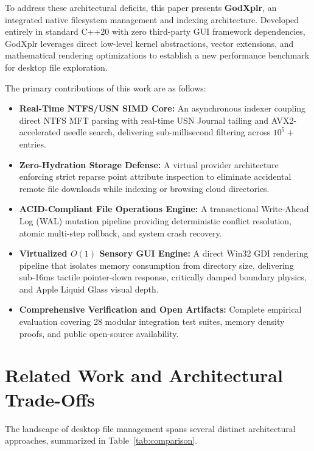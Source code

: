 \documentclass[conference]{IEEEtran}
\begin{document}
To address these architectural deficits, this paper presents \textbf{GodXplr}, an integrated native filesystem management and indexing architecture. Developed entirely in standard C++20 with zero third-party GUI framework dependencies, GodXplr leverages direct low-level kernel abstractions, vector extensions, and mathematical rendering optimizations to establish a new performance benchmark for desktop file exploration.

The primary contributions of this work are as follows:
\begin{itemize}
    \item \textbf{Real-Time NTFS/USN SIMD Core:} An asynchronous indexer coupling direct NTFS MFT parsing with real-time USN Journal tailing and AVX2-accelerated needle search, delivering sub-millisecond filtering across $10^5+$ entries.
    \item \textbf{Zero-Hydration Storage Defense:} A virtual provider architecture enforcing strict reparse point attribute inspection to eliminate accidental remote file downloads while indexing or browsing cloud directories.
    \item \textbf{ACID-Compliant File Operations Engine:} A transactional Write-Ahead Log (WAL) mutation pipeline providing deterministic conflict resolution, atomic multi-step rollback, and system crash recovery.
    \item \textbf{Virtualized $O(1)$ Sensory GUI Engine:} A direct Win32 GDI rendering pipeline that isolates memory consumption from directory size, delivering sub-16ms tactile pointer-down response, critically damped boundary physics, and Apple Liquid Glass visual depth.
    \item \textbf{Comprehensive Verification and Open Artifacts:} Complete empirical evaluation covering 28 modular integration test suites, memory density proofs, and public open-source availability.
\end{itemize}

\section{Related Work and Architectural Trade-Offs}

The landscape of desktop file management spans several distinct architectural approaches, summarized in Table~\ref{tab:comparison}.
\end{document}

